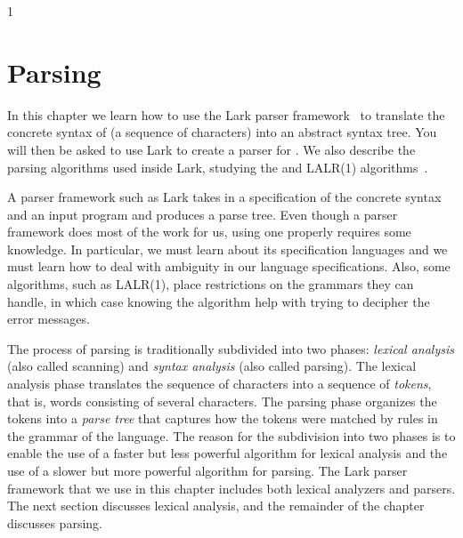 \documentclass[7x10]{TimesAPriori_MIT}%
\def\pythonEd{1}
\def\edition{1}
\newcommand{\pythonColor}[0]{}
\numberwithin{theorem}{chapter}
\numberwithin{definition}{chapter}
\numberwithin{equation}{chapter}
\begin{document}
{\if\edition\pythonEd\pythonColor
\chapter{Parsing}
\label{ch:parsing}
\setcounter{footnote}{0}

In this chapter we learn how to use the Lark parser
framework~\citep{shinan20:_lark_docs} to translate the concrete syntax
of \LangInt{} (a sequence of characters) into an abstract syntax tree.
You will then be asked to use Lark to create a parser for \LangVar{}.
We also describe the parsing algorithms used inside Lark, studying the
\citet{Earley:1970ly} and LALR(1) algorithms~\citep{DeRemer69,Anderson73}.

A parser framework such as Lark takes in a specification of the
concrete syntax and an input program and produces a parse tree. Even
though a parser framework does most of the work for us, using one
properly requires some knowledge.  In particular, we must learn about
its specification languages and we must learn how to deal with
ambiguity in our language specifications. Also, some algorithms, such
as LALR(1), place restrictions on the grammars they can handle, in
which case knowing the algorithm help with trying to decipher the
error messages.

The process of parsing is traditionally subdivided into two phases:
\emph{lexical analysis} (also called scanning) and \emph{syntax
  analysis} (also called parsing). The lexical analysis phase
translates the sequence of characters into a sequence of
\emph{tokens}, that is, words consisting of several characters. The
parsing phase organizes the tokens into a \emph{parse tree} that
captures how the tokens were matched by rules in the grammar of the
language. The reason for the subdivision into two phases is to enable
the use of a faster but less powerful algorithm for lexical analysis
and the use of a slower but more powerful algorithm for parsing.
%
%
The Lark parser framework that we use in this chapter includes both
lexical analyzers and parsers. The next section discusses lexical
analysis, and the remainder of the chapter discusses parsing.


}
\end{document}
